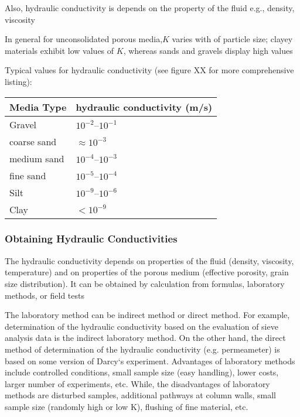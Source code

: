\documentclass[letterpaper,10pt,english]{sphinxmanual}
\begin{document}
Also, hydraulic conductivity is depends on the property of the fluid e.g., density, viscosity

In general for unconsolidated porous media,\(K\) varies with  of particle size; clayey materials exhibit low values of \(K\), whereas
sands and gravels display high values

Typical values for hydraulic conductivity (see figure XX for more comprehensive listing):


\begin{savenotes}\sphinxattablestart
\centering
\begin{tabulary}{\linewidth}[t]{|T|T|}
\hline
\sphinxstyletheadfamily 
Media Type
&\sphinxstyletheadfamily 
hydraulic conductivity (m/s)
\\
\hline
Gravel
&
\(10^{-2} – 10^{-1}\)
\\
\hline
coarse sand
&
\(\approx 10^{-3}\)
\\
\hline
medium sand
&
\(10 ^{-4} – 10^{-3}\)
\\
\hline
fine sand
&
\(10^{-5} – 10^{-4}\)
\\
\hline
Silt
&
\(10^{-9}  – 10^{-6} \)
\\
\hline
Clay
&
\(< 10^{-9} \)
\\
\hline
\end{tabulary}
\par
\sphinxattableend\end{savenotes}


\subsubsection{Obtaining Hydraulic Conductivities}
\label{\detokenize{contents/flow/lecture_04/14_darcy_law_K:obtaining-hydraulic-conductivities}}
The hydraulic conductivity depends on properties of the fluid (density, viscosity,
temperature) and on properties of the porous medium (effective porosity, grain size
distribution). It can be obtained by calculation from formulas, laboratory methods, or
field tests

The laboratory method can be indirect method or direct method. For example,
determination of the hydraulic conductivity based on the evaluation of sieve analysis
data is the indirect laboratory method. On the other hand, the direct method of
determination of the hydraulic conductivity (e.g. permeameter) is based on some version of Darcy‘s experiment. Advantages of laboratory methods include controlled
conditions, small sample size (easy handling), lower costs, larger number of
experiments, etc. While, the disadvantages of laboratory methods are disturbed
samples, additional pathways at column walls, small sample size (randomly high or low
K), flushing of fine material, etc.
\end{document}

